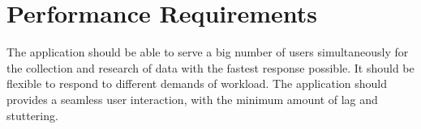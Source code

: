\newpage
\section{Performance Requirements}
The application should be able to serve a big number of users simultaneously for the collection and research of data with the fastest response possible. It should be flexible to respond to different demands of workload. The application should provides a seamless user interaction, with the minimum amount of lag and stuttering.